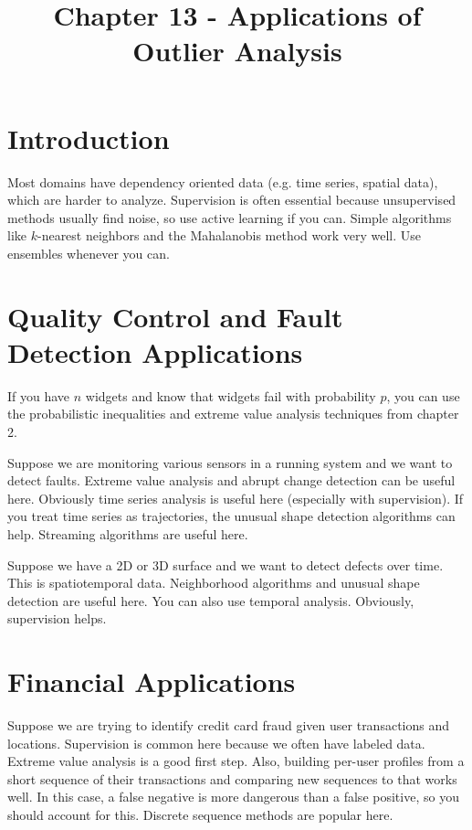 \documentclass[a4paper]{article}
\title{Chapter 13 - Applications of Outlier Analysis}
\date{}
\begin{document}
\maketitle

\section{Introduction}
Most domains have dependency oriented data (e.g. time series, spatial data),
which are harder to analyze. Supervision is often essential because unsupervised
methods usually find noise, so use active learning if you can. Simple algorithms
like $k$-nearest neighbors and the Mahalanobis method work very well. Use
ensembles whenever you can.

\section{Quality Control and Fault Detection Applications}
If you have $n$ widgets and know that widgets fail with probability $p$, you can
use the probabilistic inequalities and extreme value analysis techniques from
chapter 2.

Suppose we are monitoring various sensors in a running system and we want to
detect faults. Extreme value analysis and abrupt change detection can be useful
here. Obviously time series analysis is useful here (especially with
supervision). If you treat time series as trajectories, the unusual shape
detection algorithms can help. Streaming algorithms are useful here.

Suppose we have a 2D or 3D surface and we want to detect defects over time.
This is spatiotemporal data. Neighborhood algorithms and unusual shape detection
are useful here. You can also use temporal analysis. Obviously, supervision
helps.

\section{Financial Applications}
Suppose we are trying to identify credit card fraud given user transactions
and locations. Supervision is common here because we often have labeled data.
Extreme value analysis is a good first step. Also, building per-user profiles
from a short sequence of their transactions and comparing new sequences to that
works well. In this case, a false negative is more dangerous than a false
positive, so you should account for this. Discrete sequence methods are popular
here.
\end{document}
